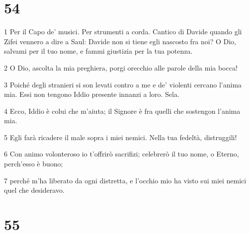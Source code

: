 \chapter{54}

\par 1 Per il Capo de' musici. Per strumenti a corda. Cantico di Davide quando gli Zifei vennero a dire a Saul: Davide non si tiene egli nascosto fra noi? O Dio, salvami per il tuo nome, e fammi giustizia per la tua potenza.
\par 2 O Dio, ascolta la mia preghiera, porgi orecchio alle parole della mia bocca!
\par 3 Poiché degli stranieri si son levati contro a me e de' violenti cercano l'anima mia. Essi non tengono Iddio presente innanzi a loro. Sela.
\par 4 Ecco, Iddio è colui che m'aiuta; il Signore è fra quelli che sostengon l'anima mia.
\par 5 Egli farà ricadere il male sopra i miei nemici. Nella tua fedeltà, distruggili!
\par 6 Con animo volonteroso io t'offrirò sacrifizi; celebrerò il tuo nome, o Eterno, perch'esso è buono;
\par 7 perché m'ha liberato da ogni distretta, e l'occhio mio ha visto sui miei nemici quel che desideravo.

\chapter{55}


